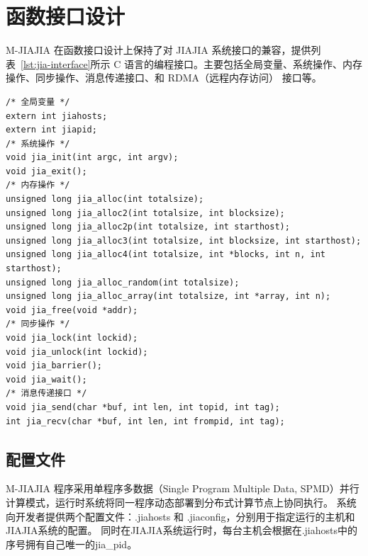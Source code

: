 {    \section{函数接口设计}\label{sec:函数接口设计}
    M-JIAJIA 在函数接口设计上保持了对 JIAJIA 系统接口的兼容，提供列表~\ref{lst:jia-interface}所示 C 语言的编程接口。主要包括全局变量、系统操作、内存操作、同步操作、消息传递接口、和 RDMA（远程内存访问） 接口等。
    \begin{lstlisting}[style=CStyle, caption={M-JIAJIA C 接口总览}, label={lst:jia-interface}]
/* 全局变量 */
extern int jiahosts;
extern int jiapid;
/* 系统操作 */
void jia_init(int argc, int argv);
void jia_exit();
/* 内存操作 */
unsigned long jia_alloc(int totalsize);
unsigned long jia_alloc2(int totalsize, int blocksize);
unsigned long jia_alloc2p(int totalsize, int starthost);
unsigned long jia_alloc3(int totalsize, int blocksize, int starthost);
unsigned long jia_alloc4(int totalsize, int *blocks, int n, int starthost);
unsigned long jia_alloc_random(int totalsize);
unsigned long jia_alloc_array(int totalsize, int *array, int n);
void jia_free(void *addr);
/* 同步操作 */
void jia_lock(int lockid);
void jia_unlock(int lockid);
void jia_barrier();
void jia_wait();
/* 消息传递接口 */
void jia_send(char *buf, int len, int topid, int tag);
int jia_recv(char *buf, int len, int frompid, int tag);
    \end{lstlisting}

    \subsection{配置文件}
    M-JIAJIA 程序采用单程序多数据（Single Program Multiple Data, SPMD）并行计算模式，运行时系统将同一程序动态部署到分布式计算节点上协同执行。
    系统向开发者提供两个配置文件：.jiahosts 和 .jiaconfig，分别用于指定运行的主机和JIAJIA系统的配置。
    同时在JIAJIA系统运行时，每台主机会根据在.jiahosts中的序号拥有自己唯一的jia\_pid。

}
